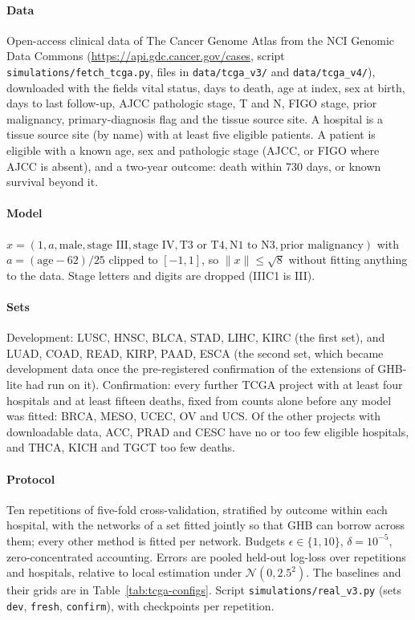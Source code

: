 \documentclass[acmsmall,screen,nonacm]{acmart}
\theoremstyle{acmdefinition}
\begin{document}
\paragraph{Data} Open-access clinical data of The Cancer Genome Atlas \cite{weinstein2013cancer,grossman2016toward} from the NCI Genomic Data Commons (\url{https://api.gdc.cancer.gov/cases}, script \texttt{simulations/fetch\_tcga.py}, files in \texttt{data/tcga\_v3/} and \texttt{data/tcga\_v4/}), downloaded with the fields vital status, days to death, age at index, sex at birth, days to last follow-up, AJCC pathologic stage, T and N, FIGO stage, prior malignancy, primary-diagnosis flag and the tissue source site. A hospital is a tissue source site (by name) with at least five eligible patients. A patient is eligible with a known age, sex and pathologic stage (AJCC, or FIGO where AJCC is absent), and a two-year outcome: death within 730 days, or known survival beyond it.

\paragraph{Model} $x=(1,a,\text{male},\text{stage III},\text{stage IV},\text{T3 or T4},\text{N1 to N3},\text{prior malignancy})$ with $a=(\text{age}-62)/25$ clipped to $[-1,1]$, so $\|x\|\le\sqrt{8}$ without fitting anything to the data. Stage letters and digits are dropped (IIIC1 is III).

\paragraph{Sets} Development: LUSC, HNSC, BLCA, STAD, LIHC, KIRC (the first set), and LUAD, COAD, READ, KIRP, PAAD, ESCA (the second set, which became development data once the pre-registered confirmation of the extensions of GHB-lite had run on it). Confirmation: every further TCGA project with at least four hospitals and at least fifteen deaths, fixed from counts alone before any model was fitted: BRCA, MESO, UCEC, OV and UCS. Of the other projects with downloadable data, ACC, PRAD and CESC have no or too few eligible hospitals, and THCA, KICH and TGCT too few deaths.

\paragraph{Protocol} Ten repetitions of five-fold cross-validation, stratified by outcome within each hospital, with the networks of a set fitted jointly so that GHB can borrow across them; every other method is fitted per network. Budgets $\epsilon\in\{1,10\}$, $\delta=10^{-5}$, zero-concentrated accounting. Errors are pooled held-out log-loss over repetitions and hospitals, relative to local estimation under $\mathcal{N}(0,2.5^2)$. The baselines and their grids are in Table~\ref{tab:tcga-configs}. Script \texttt{simulations/real\_v3.py} (sets \texttt{dev}, \texttt{fresh}, \texttt{confirm}), with checkpoints per repetition.
\end{document}
